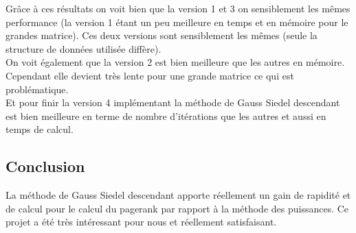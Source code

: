\documentclass[10pt,a4paper]{article}
\begin{document}
Grâce à ces résultats on voit bien que la version 1 et 3 on sensiblement les mêmes performance (la version 1 étant un peu meilleure en temps et en mémoire pour le grandes matrice). Ces deux versions sont sensiblement les mêmes (seule la structure de données utilisée diffère). \\
On voit également que la version 2 est bien meilleure que les autres en mémoire. Cependant elle devient très lente pour une grande matrice ce qui est problématique. \\
Et pour finir la version 4 implémentant la méthode de Gauss Siedel descendant est bien meilleure en terme de nombre d'itérations que les autres et aussi en temps de calcul.

\subsection{Conclusion}
La méthode de Gauss Siedel descendant apporte réellement un gain de rapidité et de calcul pour le calcul du pagerank par rapport à la méthode des puissances. Ce projet a été très intéressant pour nous et réellement satisfaisant.
\end{document}
